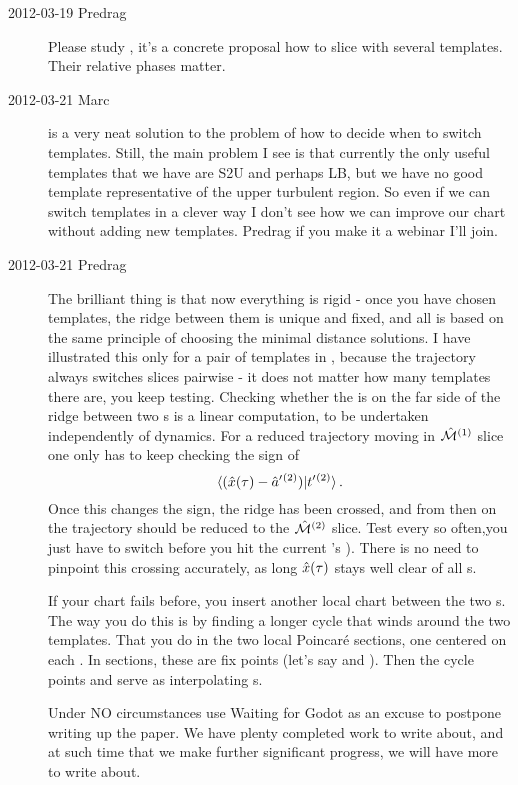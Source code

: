 \begin{description}
\item[2012-03-19 Predrag~~] Please study , it's a
concrete proposal how to slice with several templates. Their relative
phases matter.

\item[2012-03-21 Marc~~]  is a very neat solution
to the problem of how to decide when to switch templates. Still, the
main problem I see is that currently the only useful templates that we
have are S2U and perhaps LB, but we have no good template
representative of the upper turbulent region. So even if we can switch
templates in a clever way I don't see how we can improve our chart without
adding new templates. Predrag if you make it a webinar I'll join.

\item[2012-03-21 Predrag~~]
The brilliant thing is that now everything is rigid - once you have
chosen templates, the ridge between them is unique and fixed, and all is
based on the same principle of choosing the minimal distance solutions. I
have illustrated this only for a pair of templates in
, because the trajectory always switches slices
pairwise - it does not matter how many templates there are, you keep
testing. Checking whether the {\chartBord} is on the far side of
the ridge between two \slice s is a linear computation, to be undertaken
independently of dynamics. For a reduced trajectory moving in
$\hat{\cal M}{}^{(1)}$ slice one only has to keep checking the sign of
\[
\braket{(\sspRed(\zeit)- \slicep{}^{(2)})}{\sliceTan{}{}^{(2)}}
\,.
\]
Once this changes the sign, the ridge has been crossed, and from then on
the trajectory should be reduced to the $\hat{\cal M}{}^{(2)}$ slice. Test
every so often,you just have to switch before you hit the current
\template's {\chartBord}). There is no need to pinpoint this crossing
accurately, as long $\hat{x}(\tau)$ stays well clear of all \chartBord
s.

If your chart fails before, you insert another local chart between the
two \template s. The way you do this is by finding a longer cycle that
winds around the two templates. That you do in the two local Poincar\'e
sections, one centered on each \template. In sections, these are fix
points (let's say  and ). Then the cycle points
 and   serve as interpolating \template s.

Under {\color{red} NO circumstances} use
 {Waiting
for Godot} as an excuse to postpone writing up the paper. We have plenty
completed work to write about, and at such time that we make further
significant progress, we will have more to write about.


\end{description}
